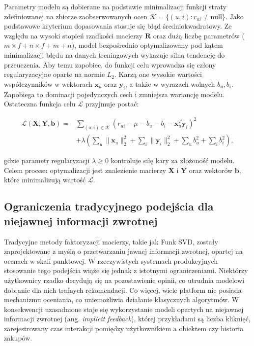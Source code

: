 Parametry modelu są dobierane na podstawie minimalizacji funkcji straty zdefiniowanej na zbiorze zaobserwowanych ocen $\mathcal{K} = \{(u, i) : r_{ui} \neq \text{null}\}$. Jako podstawowe kryterium dopasowania stosuje się błąd średniokwadratowy. Ze względu na wysoki stopień rzadkości macierzy $\mathbf{R}$ oraz dużą liczbę parametrów ($m \times f + n \times f + m + n$), model bezpośrednio optymalizowany pod kątem minimalizacji błędu na danych treningowych wykazuje silną tendencję do przeuczenia. Aby temu zapobiec, do funkcji celu wprowadza się człony regularyzacyjne oparte na normie $L_2$. Karzą one wysokie wartości współczynników w wektorach $\mathbf{x}_u$ oraz $\mathbf{y}_i$, a także w wyrazach wolnych $b_u, b_i$. Zapobiega to dominacji pojedynczych cech i zmniejsza wariancję modelu. Ostateczna funkcja celu $\mathcal{L}$ przyjmuje postać:

\begin{equation}
\begin{aligned}
\mathcal{L}(\mathbf{X}, \mathbf{Y}, \mathbf{b})
={}&
\sum_{(u,i) \in \mathcal{K}}
\left( r_{ui} - \mu - b_u - b_i - \mathbf{x}_u^T \mathbf{y}_i \right)^2 \\
&+
\lambda \left(
\sum_{u} \|\mathbf{x}_u\|_2^2
+
\sum_{i} \|\mathbf{y}_i\|_2^2
+
\sum_{u} b_u^2
+
\sum_{i} b_i^2
\right),
\end{aligned}
\end{equation}

gdzie parametr regularyzacji $\lambda \ge 0$ kontroluje siłę kary za złożoność modelu. Celem procesu optymalizacji jest znalezienie macierzy $\mathbf{X}$ i $\mathbf{Y}$ oraz wektorów $\mathbf{b}$, które minimalizują wartość $\mathcal{L}$.

\subsection{Ograniczenia tradycyjnego podejścia dla niejawnej informacji zwrotnej}

Tradycyjne metody faktoryzacji macierzy, takie jak Funk SVD, zostały zaprojektowane z myślą o przetwarzaniu jawnej informacji zwrotnej, opartej na ocenach w skali punktowej. W rzeczywistych systemach produkcyjnych stosowanie tego podejścia wiąże się jednak z istotnymi ograniczeniami. Niektórzy użytkownicy rzadko decydują się na pozostawienie opinii, co utrudnia modelowi dobranie dla nich trafnych rekomendacji. Co więcej, wiele platform nie posiada mechanizmu oceniania, co uniemożliwia działanie klasycznych algorytmów. W konsekwencji uzasadnione staje się wykorzystanie modeli opartych na niejawnej informacji zwrotnej (ang. \textit{implicit feedback}), której przykładami są liczba kliknięć, zarejestrowany czas interakcji pomiędzy użytkownikiem a obiektem czy historia zakupów.

